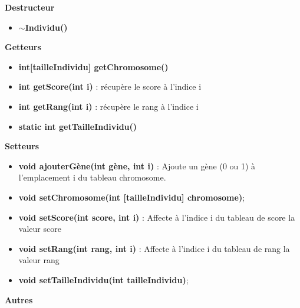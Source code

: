 \documentclass[a4paper,11pt]{article}
\begin{document}
			\textbf{Destructeur}
				\begin{itemize}
					\item \textbf{$\sim$Individu()}\\
				\end{itemize}
			\textbf{Getteurs}
					\begin{itemize}
							\item \textbf{int[tailleIndividu] getChromosome()}
							\item \textbf{int getScore(int i)} : récupère le score à l’indice i
							\item \textbf{int getRang(int i)} : récupère le rang à l’indice i
							\item \textbf{static int getTailleIndividu()}\\
					\end{itemize}
			\textbf{Setteurs}
					\begin{itemize}
							\item \textbf{void ajouterGène(int gène, int i)} : Ajoute un gène (0 ou 1) à l’emplacement i du tableau chromosome.
							\item \textbf{void setChromosome(int [tailleIndividu] chromosome)};
							\item \textbf{void setScore(int score, int i)} : Affecte à l’indice i du tableau de score la valeur score
							\item \textbf{void setRang(int rang, int i)} : Affecte à l’indice i du tableau de rang la valeur rang
							\item \textbf{void setTailleIndividu(int tailleIndividu)};\\
					\end{itemize}
			\textbf{Autres}
\end{document}
